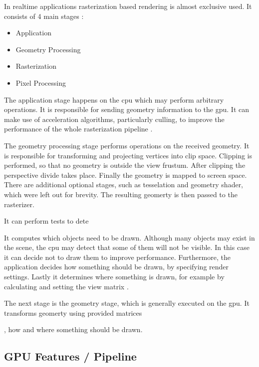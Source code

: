 {In realtime applications rasterization based rendering is almost exclusive used. It consists of 4 main stages \cite{akine:2018:realtime}:

\begin{itemize}
	\item Application
	\item Geometry Processing
	\item Rasterization
	\item Pixel Processing
\end{itemize}

The application stage happens on the \gls{cpu} which may perform arbitrary operations. It is responsible for sending geometry information to the \gls{gpu}. It can make use of acceleration algorithms, particularly culling, to improve the performance of the whole rasterization pipeline \cite{akine:2018:realtime}.

The geometry processing stage performs operations on the received geometry. It is responsible for transforming and projecting vertices into clip space. Clipping is performed, so that no geometry is outside the view frustum. After clipping the perspective divide takes place. Finally the geometry is mapped to screen space. There are additional optional stages, such as tesselation and geometry shader, which were left out for brevity. The resulting geomerty is then passed to the rasterizer.

It can perform tests to dete


 It computes which objects need to be drawn. Although many objects may exist in the scene, the \gls{cpu} may detect that some of them will not be visible. In this case it can decide not to draw them to improve performance. Furthermore, the application decides how something should be drawn, by specifying render settings. Lastly it determines where something is drawn, for example by calculating and setting the view matrix \cite{akine:2018:realtime}.

The next stage is the geometry stage, which is generally executed on the \gls{gpu}. It transforms geomerty using provided matrices

 


, how and where something should be drawn.}

\cite{akine:2018:realtime}
\fi
\subsection{GPU Features / Pipeline}


